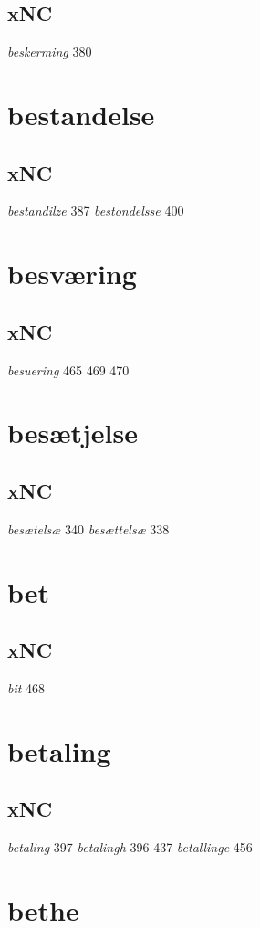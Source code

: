 \documentclass[a4paper,twocolumn]{article}
\begin{document}
\subsection{xNC}
\label{sec:orgb97363f}
\emph{beskerming} 380 
\section{bestandelse}
\label{sec:org077fe1b}
\subsection{xNC}
\label{sec:orgfe6fb72}
\emph{bestandilze} 387 \emph{bestondelsse} 400 
\section{besværing}
\label{sec:orge21c36a}
\subsection{xNC}
\label{sec:orga0ea39c}
\emph{besuering} 465 469 470 
\section{besætjelse}
\label{sec:org5012203}
\subsection{xNC}
\label{sec:org16cab76}
\emph{besætelsæ} 340 \emph{besættelsæ} 338 
\section{bet}
\label{sec:orgd750778}
\subsection{xNC}
\label{sec:org67af080}
\emph{bit} 468 
\section{betaling}
\label{sec:orgfe52c9d}
\subsection{xNC}
\label{sec:org545c486}
\emph{betaling} 397 \emph{betalingh} 396 437 \emph{betallinge} 456 
\section{bethe}
\label{sec:orge9c2ad4}
\end{document}

